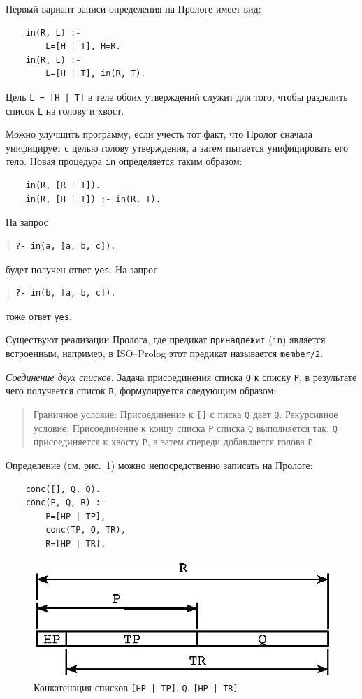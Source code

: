\documentclass[12pt, openany, twoside]{book} %
\begin{document}
\noindent Первый вариант записи определения на Прологе имеет вид:
{\tt\begin{verbatim}
    in(R, L) :-
        L=[H | T], H=R.
    in(R, L) :-
        L=[H | T], in(R, T).
\end{verbatim}}

\noindent Цель {\tt L = [H | T]} в теле обоих утверждений служит для того, чтобы разделить список {\tt L} на голову и хвост.

Можно улучшить программу, если учесть тот факт, что Пролог сначала унифицирует с целью голову утверждения, а затем пытается унифицировать его тело. Новая процедура {\tt in} определяется таким образом:
{\tt\begin{verbatim}
    in(R, [R | Т]).
    in(R, [H | Т]) :- in(R, T).
\end{verbatim}}

\noindent На запрос
{\tt\begin{verbatim}
| ?- in(а, [а, b, с]).
\end{verbatim}}
\noindent будет получен ответ {\tt yes}.
\noindent На запрос
{\tt\begin{verbatim}
| ?- in(b, [a, b, с]).
\end{verbatim}}
\noindent тоже ответ {\tt yes}.

Существуют реализации Пролога, где предикат {\tt принадлежит} ({\tt in}) является встроенным, например, в ISO--Prolog этот предикат называется \texttt{member/2}.

\emph{Соединение двух списков}. Задача присоединения списка {\tt Q} к списку {\tt Р}, в результате чего получается список {\tt R}, формулируется следующим образом:
\begin{quote}
\noindent Граничное условие: Присоединение к {\tt []} с писка {\tt Q} дает {\tt Q}.
\noindent Рекурсивное условие: Присоединение к концу списка {\tt Р} списка {\tt Q} выполняется так: {\tt Q} присоединяется к хвосту {\tt Р}, а затем спереди добавляется голова {\tt Р}.
\end{quote}

Определение (см. рис.~\ref{pic:list_descr}) можно непосредственно записать на Прологе:
{\tt\begin{verbatim}
    conc([], Q, Q).
    conc(Р, Q, R) :-
        Р=[НР | ТР],
        conc(TP, Q, TR),
        R=[HP | TR].
\end{verbatim}}

\begin{figure}[hbt]
\begin{center}
\includegraphics[scale=0.7]{pics/list_descr.eps}
\end{center}
\caption{Конкатенация списков {\tt [HP | TP]}, {\tt Q}, {\tt [HP | TR]}}
\label{pic:list_descr}
\end{figure}
\end{document}
